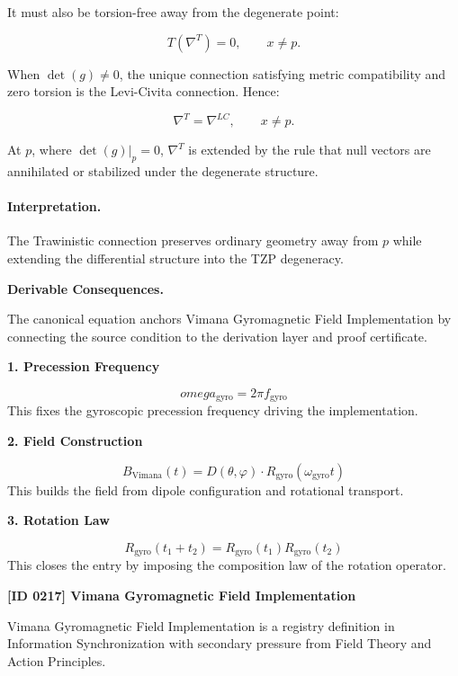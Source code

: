 It must also be torsion-free away from the degenerate point:

\begin{equation}
T(\nabla^{T})=0,
\qquad x\neq p .
\end{equation}

When $\det(g)\neq 0$, the unique connection satisfying metric compatibility and zero torsion is the Levi-Civita connection. Hence:

\begin{equation}
\nabla^{T}=\nabla^{LC},
\qquad x\neq p .
\end{equation}

At $p$, where $\det(g)|_p=0$, $\nabla^{T}$ is extended by the rule that null vectors are annihilated or stabilized under the degenerate structure.

\paragraph{Interpretation.}
The Trawinistic connection preserves ordinary geometry away from $p$ while extending the differential structure into the TZP degeneracy.

\par\vspace{0.35em}
\noindent\textbf{Derivable Consequences.}\quad
\begingroup
\footnotesize
\raggedright
The canonical equation anchors Vimana Gyromagnetic Field Implementation by connecting the source condition to the derivation layer and proof certificate.
\par\endgroup

\noindent\textbf{1. Precession Frequency}\par
\[
omega_{\mathrm{gyro}} = 2\pi f_{\mathrm{gyro}}
\]
\noindent This fixes the gyroscopic precession frequency driving the implementation.\par
\noindent\textbf{2. Field Construction}\par
\[
B_{\mathrm{Vimana}}(t) = D(\theta,\varphi)\cdot R_{\mathrm{gyro}}(\omega_{\mathrm{gyro}} t)
\]
\noindent This builds the field from dipole configuration and rotational transport.\par
\noindent\textbf{3. Rotation Law}\par
\[
R_{\mathrm{gyro}}(t_1+t_2)=R_{\mathrm{gyro}}(t_1)R_{\mathrm{gyro}}(t_2)
\]
\noindent This closes the entry by imposing the composition law of the rotation operator.\par

\clearpage
\noindent\textbf{[ID 0217] Vimana Gyromagnetic Field Implementation}\par
\vspace{0.35em}
\begingroup\small
{}
Vimana Gyromagnetic Field Implementation is a registry definition in Information Synchronization with secondary pressure from Field Theory and Action Principles.

